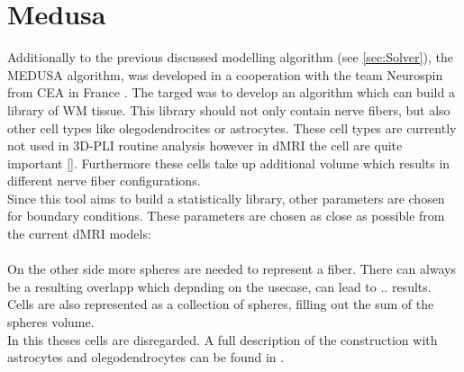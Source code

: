 \section{Medusa}
% 
Additionally to the previous discussed modelling algorithm (see \cref{sec:Solver}), the \ac{MEDUSA} algorithm, was developed in a cooperation with the team Neurospin from \ac{CEA} in France \cite{Ginsburger2019}. The targed was to develop an algorithm which can build a library of \ac{WM} tissue. This library should not only contain nerve fibers, but also other cell types like olegodendrocites or astrocytes. These cell types are currently not used in \ac{3D-PLI} routine analysis however in \ac{dMRI} the cell are quite important [\dummy]. Furthermore these cells take up additional volume which results in different nerve fiber configurations.\\
% 
Since this tool aims to build a statistically library, other parameters are chosen for boundary conditions. These parameters are chosen as close as possible from the current \ac{dMRI} models:
\dummy\\
\dummy\\
% 
% 
On the other side more spheres are needed to represent a fiber. There can always be a resulting overlapp which depnding on the usecase, can lead to .. results.\\
% 
Cells are also represented as a collection of spheres, filling out the sum of the spheres volume. \\
%
In this theses cells are disregarded. A full description of the construction with astrocytes and olegodendrocytes can be found in \cite{Ginsburger2019}.
% 
